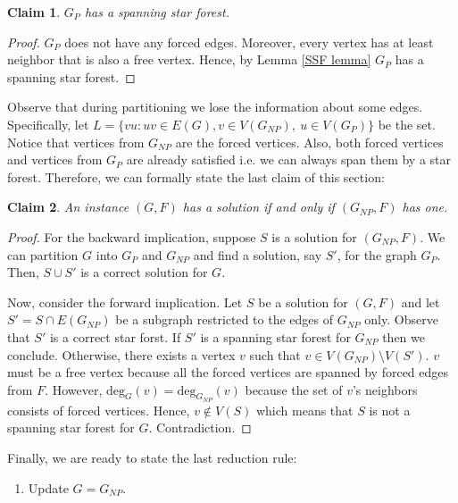 \documentclass[en]{pracamgr}
\newtheorem{claim}{Claim}
\newcommand{\degree}[2]{\textrm{deg}_{#1}(#2)}
\begin{document}
\begin{claim}
	$G_P$ has a spanning star forest.
\end{claim}

\begin{proof}
	$G_P$ does not have any forced edges. Moreover, every vertex has at least neighbor that is also a free vertex. Hence, by Lemma \ref{SSF lemma} $G_P$ has a spanning star forest.
\end{proof}

Observe that during partitioning we lose the information about some edges. Specifically, let $L= \{vu: uv \in E(G), v \in V(G_{NP}),\ u \in V(G_P)\}$ be the set. Notice that vertices from $G_{NP}$ are the forced vertices. Also, both forced vertices and vertices from $G_P$ are already satisfied i.e. we can always span them by a star forest. Therefore, we can formally state the last claim of this section:

\begin{claim}\label{GNP partition}
	An instance $(G,F)$ has a solution if and only if $(G_{NP},F)$ has one.
\end{claim}

\begin{proof}
	For the backward implication, suppose $S$ is a solution for $(G_{NP},F)$. We can partition $G$ into $G_P$ and $G_{NP}$ and find a solution, say $S'$, for the graph $G_P$. Then, $S \cup S'$ is a correct solution for $G$.
	
	Now, consider the forward implication. Let $S$ be a solution for $(G, F)$ and let $S' = S \cap E(G_{NP})$ be a subgraph restricted to the edges of $G_{NP}$ only. Observe that $S'$ is a correct star forst. If $S'$ is a spanning star forest for $G_{NP}$ then we conclude. Otherwise, there exists a vertex $v$ such that $v \in V(G_{NP}) \setminus V(S')$. $v$ must be a free vertex because all the forced vertices are spanned by forced edges from $F$. However, $\degree{G}{v}=\degree{G_{NP}}{v}$ because the set of $v$'s neighbors consists of forced vertices. Hence, $v \notin V(S)$ which means that $S$ is not a spanning star forest for $G$. Contradiction.
\end{proof}

Finally, we are ready to state the last reduction rule:

\begin{enumerate}[leftmargin=*,label=\textbf{Reduction \arabic{enumi}},resume,wide, labelwidth=!, labelindent=0pt]
	\item Update $G=G_{NP}$.
\end{enumerate}
\end{document}
